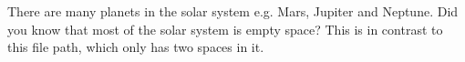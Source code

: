 There are many planets in the solar system e.g. Mars, Jupiter and Neptune.
Did you know that most of the solar system is empty space?
This is in contrast to this file path, which only has two spaces in it.
